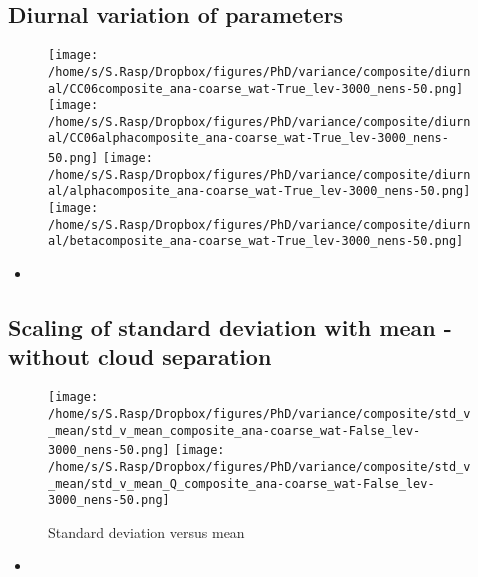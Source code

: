\documentclass[a4paper, 12pt]{article}
\begin{document}
\subsection{Diurnal variation of parameters}
\begin{figure}[h!]
\noindent \centering
\texttt{[image: /home/s/S.Rasp/Dropbox/figures/PhD/variance/composite/diurnal/CC06composite\_ana-coarse\_wat-True\_lev-3000\_nens-50.png]}
\texttt{[image: /home/s/S.Rasp/Dropbox/figures/PhD/variance/composite/diurnal/CC06alphacomposite\_ana-coarse\_wat-True\_lev-3000\_nens-50.png]}
\texttt{[image: /home/s/S.Rasp/Dropbox/figures/PhD/variance/composite/diurnal/alphacomposite\_ana-coarse\_wat-True\_lev-3000\_nens-50.png]}
\texttt{[image: /home/s/S.Rasp/Dropbox/figures/PhD/variance/composite/diurnal/betacomposite\_ana-coarse\_wat-True\_lev-3000\_nens-50.png]}\\
\caption{} \label{fig:geographical}
\end{figure}
\begin{itemize}
 \item 
\end{itemize}

\newpage


\subsection{Scaling of standard deviation with mean - without cloud separation}
\begin{figure}[h!]
\noindent \centering
\texttt{[image: /home/s/S.Rasp/Dropbox/figures/PhD/variance/composite/std\_v\_mean/std\_v\_mean\_composite\_ana-coarse\_wat-False\_lev-3000\_nens-50.png]}
\texttt{[image: /home/s/S.Rasp/Dropbox/figures/PhD/variance/composite/std\_v\_mean/std\_v\_mean\_Q\_composite\_ana-coarse\_wat-False\_lev-3000\_nens-50.png]}\\
\caption{Standard deviation versus mean} \label{fig:geographical}
\end{figure}
\begin{itemize}
 \item 
\end{itemize}

\newpage
\end{document}
